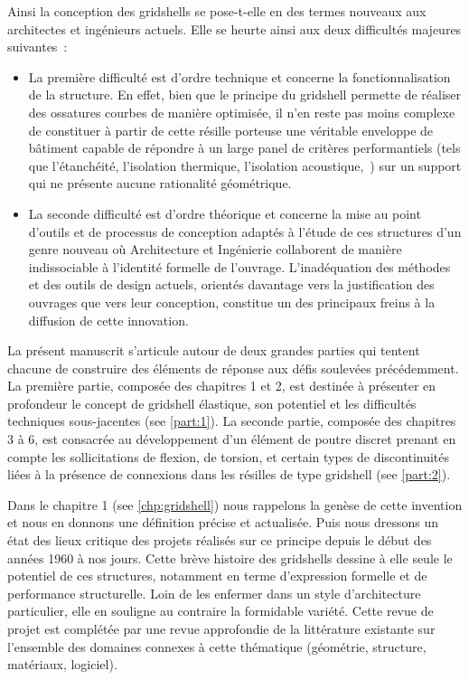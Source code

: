 Ainsi la conception des gridshells se pose-t-elle en des termes nouveaux aux architectes et ingénieurs actuels. Elle se heurte ainsi aux deux difficultés majeures suivantes~:
\begin{itemize}
\item
La première difficulté est d'ordre technique et concerne la fonctionnalisation de la structure. En effet, bien que le principe du gridshell permette de réaliser des ossatures courbes de manière optimisée, il n'en reste pas moins complexe de constituer à partir de cette résille porteuse une véritable enveloppe de bâtiment capable de répondre à un large panel de critères performantiels (tels que l'étanchéité, l'isolation thermique, l'isolation acoustique,~\telp{}) sur un support qui ne présente aucune rationalité géométrique. 
\item
La seconde difficulté est d'ordre théorique et concerne la mise au point d'outils et de processus de conception adaptés à l'étude de ces structures d'un genre nouveau où Architecture et Ingénierie collaborent de manière indissociable à l'identité formelle de l'ouvrage. L'inadéquation des méthodes et des outils de design actuels, orientés davantage vers la justification des ouvrages que vers leur conception, constitue un des principaux freins à la diffusion de cette innovation.
\end{itemize}

La présent manuscrit s'articule autour de deux grandes parties qui tentent chacune de construire des éléments de réponse aux défis soulevées précédemment. La première partie, composée des chapitres 1 et 2, est destinée à présenter en profondeur le concept de gridshell élastique, son potentiel et les difficultés techniques sous-jacentes (see \cref{part:1}). La seconde partie, composée des chapitres 3 à 6, est consacrée au développement d'un élément de poutre discret prenant en compte les sollicitations de flexion, de torsion, et certain types de discontinuités liées à la présence de connexions dans les résilles de type gridshell (see \cref{part:2}). 

Dans le chapitre 1 (see \cref{chp:gridshell}) nous rappelons la genèse de cette invention et nous en donnons une définition précise et actualisée. Puis nous dressons un état des lieux critique des projets réalisés sur ce principe depuis le début des années 1960 à nos jours. Cette brève histoire des gridshells dessine à elle seule le potentiel de ces structures, notamment en terme d'expression formelle et de performance structurelle. Loin de les enfermer dans un style d'architecture particulier, elle en souligne au contraire la formidable variété. Cette revue de projet est complétée par une revue approfondie de la littérature existante sur l'ensemble des domaines connexes à cette thématique (géométrie, structure, matériaux, logiciel).

